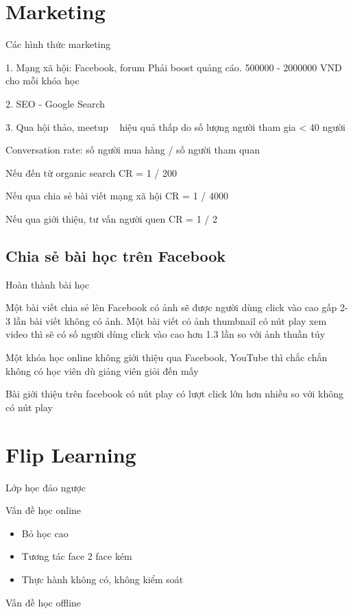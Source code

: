 \section{Marketing}

Các hình thức marketing

1. Mạng xã hội: Facebook, forum
Phải boost quảng cáo. 500000 - 2000000 VND cho mỗi khóa học

2. SEO - Google Search

3. Qua hội thảo, meetup ~ hiệu quả thấp do số lượng người tham gia < 40 người

Conversation rate: số người mua hàng / số người tham quan

Nếu đến từ organic search CR = 1 / 200

Nếu qua chia sẻ bài viết mạng xã hội CR = 1 / 4000

Nếu qua giới thiệu, tư vấn người quen CR = 1 / 2

\subsection{Chia sẻ bài học trên Facebook}

Hoàn thành bài học

Một bài viết chia sẻ lên Facebook có ảnh sẽ được người dùng click vào cao gấp 2-3 lần bài viết không có ảnh.
Một bài viết có ảnh thumbnail có nút play xem video thì sẽ có số người dùng click vào cao hơn 1.3 lần so với ảnh thuần túy

Một khóa học online không giới thiệu qua Facebook, YouTube thì chắc chắn không có học viên dù giảng viên giỏi đến mấy

Bài giới thiệu trên facebook có nút play có lượt click lớn hơn nhiều so với không có nút play

\section{Flip Learning}

Lớp học đảo ngược

Vấn đề học online

\begin{itemize}
  \item Bỏ học cao
  \item Tương tác face 2 face kém
  \item Thực hành không có, không kiểm soát
\end{itemize}

Vấn đề học offline

